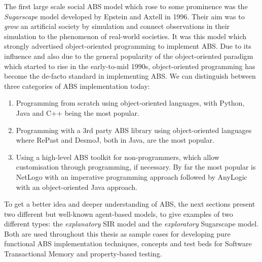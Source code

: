 The first large scale social ABS model which rose to some prominence was the \textit{Sugarscape} model developed by Epstein and Axtell in 1996. Their aim was to \textit{grow} an artificial society by simulation and connect observations in their simulation to the phenomenon of real-world societies. It was this model which strongly advertised object-oriented programming to implement ABS. Due to its influence and also due to the general popularity of the object-oriented paradigm which started to rise in the early-to-mid 1990s, object-oriented programming has become the de-facto standard in implementing ABS. We can distinguish between three categories of ABS implementation today: %
\begin{enumerate}
	\item Programming from scratch using object-oriented languages, with Python, Java and C++ being the most popular.
	\item Programming with a 3rd party ABS library using object-oriented languages where RePast and DesmoJ, both in Java, are the most popular.
	\item Using a high-level ABS toolkit for non-programmers, which allow customisation through programming, if necessary. By far the most popular is NetLogo with an imperative programming approach followed by AnyLogic with an object-oriented Java approach.
\end{enumerate}

To get a better idea and deeper understanding of ABS, the next sections present two different but well-known agent-based models, to give examples of two different types: the \textit{explanatory} SIR model and the \textit{exploratory} Sugarscape model. Both are used throughout this thesis as sample cases for developing pure functional ABS implementation techniques, concepts and test beds for Software Transactional Memory and property-based testing.




